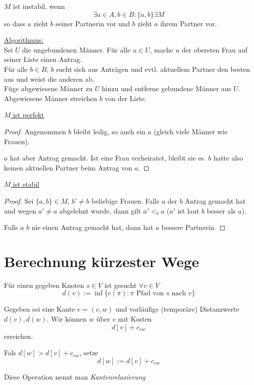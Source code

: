 \documentclass[11pt]{scrbook}
\begin{document}
\begin{df}
$M$ ist instabil, wenn
\[
\exists a\in A, b\in B: \{a,b\} \exists M
\]
so dass $a$ zieht $b$ seiner Partnerin vor und $b$ zieht $a$ ihrem Partner vor.
\end{df}

\underline{Algorithmus:}\\
Sei $U$ die ungebundenen Männer.
Für alle $u\in U$, mache $u$ der obersten Frau auf seiner Liste einen Antrag.\\
Für alle $b\in B$, $b$ sucht sich aus Anträgen und evtl. aktuellem Partner den besten aus und weist die anderen ab.\\
Füge abgewiesene Männer zu $U$ hinzu und entferne gebundene Männer aus $U$.\\
Abgewiesene Männer streichen $b$ von der Liste.

\underline{$M$ ist perfekt}\\
\begin{proof}
	Angenommen $b$ bleibt ledig, so auch ein $a$ (gleich viele Männer wie Frauen).

$a$ hat aber Antrag gemacht.
Ist eine Frau verheiratet, bleibt sie es.
$b$ hatte also keinen aktuellen Partner beim Antrag von $a$.
\end{proof}

\underline{$M$ ist stabil}\\
\begin{proof}
Sei $\{a,b\}\in M$, $b'\neq b$ beliebige Frauen.
Falls $a$ der $b$ Antrag gemacht hat und wegen $a'\neq a$ abgelehnt wurde, dann gilt
$a'<_b a$ ($a'$ ist laut $b$ besser als $a$).

Falls $a$ $b$ nie einen Antrag gemacht hat, dann hat $a$ bessere Partnerin.
\end{proof}

\section{Berechnung kürzester Wege}

Für einen gegeben Knoten $s\in V$ ist gesucht $\forall v\in V$
\[
d(v) :=  \inf \{c(\pi):\pi \text{ Pfad von $s$ nach $v$}\}
\]


\begin{df}[Kantenrelaxierung]
Gegeben sei eine Kante $e=(v,w)$ und vorläufige (temporäre) Distanzwerte $d(v), d(w)$.
Wir können $w$ über $v$ mit Kosten
\[
d[v]+c_{vw}
\]
erreichen.

Fals $d[w] > d[v] + c_{vw}$, setze
\[
d[w] := d[v] + c_{vw}
\]

Diese Operation nennt man \emph{Kantenrelaxierung}
\end{df}
\end{document}
